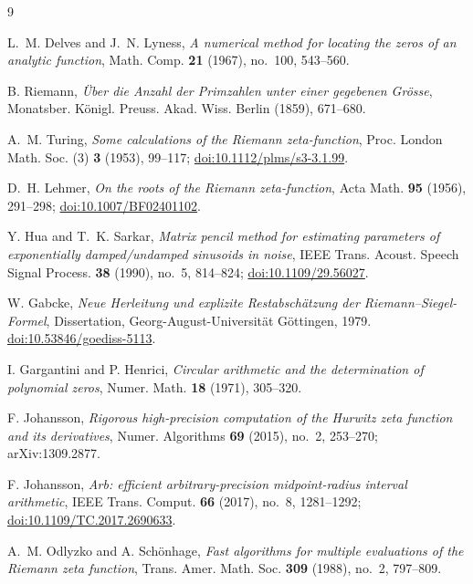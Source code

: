 \documentclass[11pt]{article}
\theoremstyle{plain}
\theoremstyle{definition}
\theoremstyle{remark}
\begin{document}
\begin{thebibliography}{9}

L.~M. Delves and J.~N. Lyness,
\emph{A numerical method for locating the zeros of an analytic function},
Math. Comp. \textbf{21} (1967), no.~100, 543--560.

B. Riemann,
\emph{\"Uber die Anzahl der Primzahlen unter einer gegebenen Gr\"osse},
Monatsber. K\"onigl. Preuss. Akad. Wiss. Berlin (1859), 671--680.

A.~M. Turing,
\emph{Some calculations of the Riemann zeta-function},
Proc. London Math. Soc. (3) \textbf{3} (1953), 99--117;
\href{https://doi.org/10.1112/plms/s3-3.1.99}{doi:10.1112/plms/s3-3.1.99}.

D.~H. Lehmer,
\emph{On the roots of the Riemann zeta-function},
Acta Math. \textbf{95} (1956), 291--298;
\href{https://doi.org/10.1007/BF02401102}{doi:10.1007/BF02401102}.

Y. Hua and T.~K. Sarkar,
\emph{Matrix pencil method for estimating parameters of exponentially
damped/undamped sinusoids in noise},
IEEE Trans. Acoust. Speech Signal Process. \textbf{38} (1990), no.~5, 814--824;
\href{https://doi.org/10.1109/29.56027}{doi:10.1109/29.56027}.

W. Gabcke,
\emph{Neue Herleitung und explizite Restabsch\"atzung der Riemann--Siegel-Formel},
Dissertation, Georg-August-Universit\"at G\"ottingen, 1979.
\href{https://doi.org/10.53846/goediss-5113}{doi:10.53846/goediss-5113}.

I. Gargantini and P. Henrici,
\emph{Circular arithmetic and the determination of polynomial zeros},
Numer. Math. \textbf{18} (1971), 305--320.

F. Johansson,
\emph{Rigorous high-precision computation of the Hurwitz zeta function and its
derivatives},
Numer. Algorithms \textbf{69} (2015), no.~2, 253--270; arXiv:1309.2877.

F. Johansson,
\emph{Arb: efficient arbitrary-precision midpoint-radius interval arithmetic},
IEEE Trans. Comput. \textbf{66} (2017), no.~8, 1281--1292;
\href{https://doi.org/10.1109/TC.2017.2690633}{doi:10.1109/TC.2017.2690633}.

A.~M. Odlyzko and A. Sch\"onhage,
\emph{Fast algorithms for multiple evaluations of the Riemann zeta function},
Trans. Amer. Math. Soc. \textbf{309} (1988), no.~2, 797--809.


\end{thebibliography}
\end{document}
